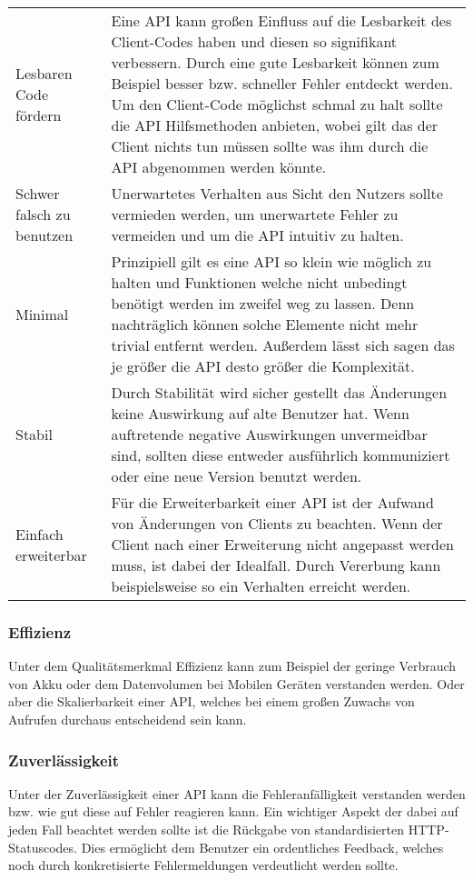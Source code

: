 \begin{table}
\begin{tabu}{|p{0.25\textwidth}|p{0.7\textwidth}|}
		Lesbaren Code fördern & Eine \gls{API} kann großen Einfluss auf die Lesbarkeit des Client-Codes haben und diesen so signifikant verbessern. Durch eine gute Lesbarkeit können zum Beispiel besser bzw. schneller Fehler entdeckt werden. Um den Client-Code möglichst schmal zu halt sollte die \gls{API} Hilfsmethoden anbieten, wobei gilt das der Client nichts tun müssen sollte was ihm durch die \gls{API} abgenommen werden könnte.\\
		Schwer falsch zu benutzen & Unerwartetes Verhalten aus Sicht den Nutzers sollte vermieden werden, um unerwartete Fehler zu vermeiden und um die \gls{API} intuitiv zu halten.\\
		Minimal & Prinzipiell gilt es eine \gls{API} so klein wie möglich zu halten und Funktionen welche nicht unbedingt benötigt werden im zweifel weg zu lassen. Denn nachträglich können solche Elemente nicht mehr trivial entfernt werden. Außerdem lässt sich sagen das je größer die \gls{API} desto größer die Komplexität. \\
		Stabil & Durch Stabilität wird sicher gestellt das Änderungen keine Auswirkung auf alte Benutzer hat. Wenn auftretende negative Auswirkungen unvermeidbar sind, sollten diese entweder ausführlich kommuniziert oder eine neue Version benutzt werden. \\
		Einfach erweiterbar & Für die Erweiterbarkeit einer \gls{API} ist der Aufwand von Änderungen von Clients zu beachten. Wenn der Client nach einer Erweiterung nicht angepasst werden muss, ist dabei der Idealfall. Durch Vererbung kann beispielsweise so ein Verhalten erreicht werden. \\
		\hline
	\end{tabu}
\end{table}

\subsubsection{Effizienz}
Unter dem Qualitätsmerkmal Effizienz kann zum Beispiel der geringe Verbrauch von Akku oder dem Datenvolumen bei Mobilen Geräten verstanden werden. Oder aber die Skalierbarkeit einer \gls{API}, welches bei einem großen Zuwachs von Aufrufen durchaus entscheidend sein kann.

\subsubsection{Zuverlässigkeit}
Unter der Zuverlässigkeit einer \gls{API} kann die Fehleranfälligkeit verstanden werden bzw. wie gut diese auf Fehler reagieren kann. Ein wichtiger Aspekt der dabei auf jeden Fall beachtet werden sollte ist die Rückgabe von standardisierten HTTP-Statuscodes. Dies ermöglicht dem Benutzer ein ordentliches Feedback, welches noch durch konkretisierte Fehlermeldungen verdeutlicht werden sollte.

